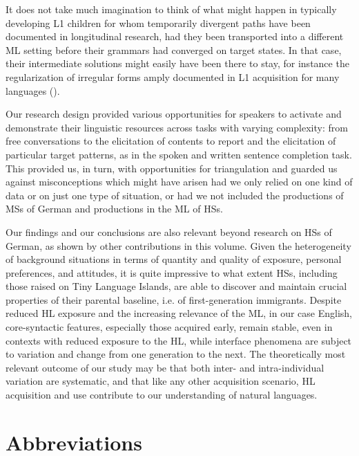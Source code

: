 \documentclass[output=paper]{langscibook}
\begin{document}
It does not take much imagination to think of what might happen in typically developing L1 children for whom temporarily divergent paths have been documented in longitudinal research, had they been transported into a different ML setting before their grammars had converged on target states. In that case, their intermediate solutions might easily have been there to stay, for instance the regularization of irregular forms amply documented in L1 acquisition for many languages (\citealt{Yang2016, GawlitzekMaiwald1994How}).

Our research design provided various opportunities for speakers to activate and demonstrate their linguistic resources across tasks with varying complexity: from free conversations to the elicitation of contents to report and the elicitation of particular target patterns, as in the spoken and written sentence completion task. This provided us, in turn, with opportunities for triangulation and guarded us against misconceptions which might have arisen had we only relied on one kind of data or on just one type of situation, or had we not included the productions of MSs of German and productions in the ML of HSs.

Our findings and our conclusions are also relevant beyond research on HSs of German, as shown by other contributions in this volume. Given the heterogeneity of background situations in terms of quantity and quality of exposure, personal preferences, and attitudes, it is quite impressive to what extent HSs, including those raised on Tiny Language Islands, are able to discover and maintain crucial properties of their parental baseline, i.e. of first-generation immigrants. Despite reduced HL exposure and the increasing relevance of the ML, in our case English, core-syntactic features, especially those acquired early, remain stable, even in contexts with reduced exposure to the HL, while interface phenomena are subject to variation and change from one generation to the next. The theoretically most relevant outcome of our study may be that both inter- and intra-individual variation are systematic, and that like any other acquisition scenario, HL acquisition and use contribute to our understanding of natural languages.

\section*{Abbreviations}
\end{document}

